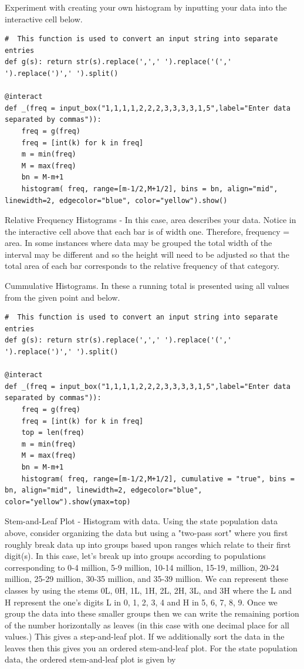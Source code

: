 \documentclass[10pt,]{book}
\theoremstyle{plain}
\theoremstyle{definition}
\theoremstyle{definition}
\numberwithin{equation}{section}
\begin{document}
		
		
%
\par
Experiment with creating your own histogram by inputting your data into the interactive cell below.
\begin{lstlisting}[style=sageinput]
#  This function is used to convert an input string into separate entries
def g(s): return str(s).replace(',',' ').replace('(',' ').replace(')',' ').split()

@interact
def _(freq = input_box("1,1,1,1,2,2,2,3,3,3,3,1,5",label="Enter data separated by commas")):
    freq = g(freq)
    freq = [int(k) for k in freq]
    m = min(freq)
    M = max(freq)
    bn = M-m+1
    histogram( freq, range=[m-1/2,M+1/2], bins = bn, align="mid", linewidth=2, edgecolor="blue", color="yellow").show()
\end{lstlisting}


\par
Relative Frequency Histograms - In this case, area describes your data.  Notice in the interactive cell above that each bar is of width one. Therefore, frequency = area. In some instances where data may be grouped the total width of the interval may be different and so the height will need to be adjusted so that the total area of each bar corresponds to the relative frequency of that category.%
\par
Cummulative Histograms.  In these a running total is presented using all values from the given point and below.
\begin{lstlisting}[style=sageinput]
#  This function is used to convert an input string into separate entries
def g(s): return str(s).replace(',',' ').replace('(',' ').replace(')',' ').split()

@interact
def _(freq = input_box("1,1,1,1,2,2,2,3,3,3,3,1,5",label="Enter data separated by commas")):
    freq = g(freq)
    freq = [int(k) for k in freq]
    top = len(freq)
    m = min(freq)
    M = max(freq)
    bn = M-m+1
    histogram( freq, range=[m-1/2,M+1/2], cumulative = "true", bins = bn, align="mid", linewidth=2, edgecolor="blue", color="yellow").show(ymax=top)
\end{lstlisting}
		
\par
Stem-and-Leaf Plot - Histogram with data. Using the state population data above, consider organizing the data but using a "two-pass sort" where you first roughly break data up into groups based upon ranges which relate to their first digit(s). In this case, let's break up into groups according to populations corresponding to 0-4 million, 5-9 million, 10-14 million, 15-19, million, 20-24 million, 25-29 million, 30-35 million, and 35-39 million. We can represent these classes by using the stems 0L, 0H, 1L, 1H, 2L, 2H, 3L, and 3H where the L and H represent the one's digits L in {0, 1, 2, 3, 4} and H in {5, 6, 7, 8, 9}.  Once we group the data into these smaller groups then we can write the remaining portion of the number horizontally as leaves (in this case with one decimal place for all values.) This gives a step-and-leaf plot. If we additionally sort the data in the leaves then this gives you an ordered stem-and-leaf plot. For the state population data, the ordered stem-and-leaf plot is given by
		
\end{document}
